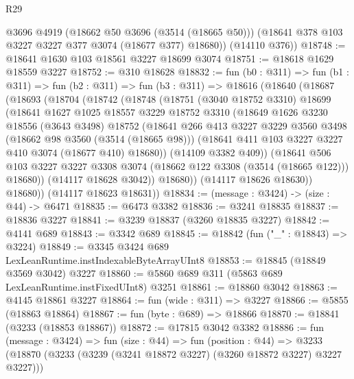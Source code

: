 \begin{lexlean}{R29}
\begin{coremodule}
        @3696
        @4919
        (@18662 @50 @3696 (@3514 (@18665 @50)))
        (@18641 @378 @103 @3227 @3227 @377 @3074 (@18677 @377) @18680))
      (@14110 @376))
@18748 := @18641 @1630 @103 @18561 @3227 @18699 @3074
@18751 := @18618 @1629 @18559 @3227
@18752 := @310 @18628
@18832 := fun (b0 : @311) =>
  fun (b1 : @311) =>
  fun (b2 : @311) =>
  fun (b3 : @311) =>
  @18616
    (@18640
      (@18687
        (@18693
          (@18704
            (@18742
              (@18748
                (@18751
                  (@3040 @18752 @3310)
                  @18699
                  (@18641
                    @1627
                    @1025
                    @18557
                    @3229
                    @18752
                    @3310
                    (@18649
                      @1626
                      @3230
                      @18556
                      (@3643 @3498)
                      @18752
                      (@18641
                        @266
                        @413
                        @3227
                        @3229
                        @3560
                        @3498
                        (@18662 @98 @3560 (@3514 (@18665 @98)))
                        (@18641 @411 @103 @3227 @3227 @410 @3074 (@18677 @410) @18680))
                      (@14109 @3382 @409))
                    (@18641
                      @506
                      @103
                      @3227
                      @3227
                      @3308
                      @3074
                      (@18662 @122 @3308 (@3514 (@18665 @122)))
                      @18680))
                  (@14117 @18628 @3042))
                @18680))
            (@14117 @18626 @18630))
          @18680))
      (@14117 @18623 @18631))
@18834 := (message : @3424) -> (size : @44) -> @6471
@18835 := @6473 @3382
@18836 := @3241 @18835
@18837 := @18836 @3227
@18841 := @3239 @18837 (@3260 @18835 @3227)
@18842 := @4141 @689
@18843 := @3342 @689
@18845 := @18842 (fun ("_" : @18843) => @3224)
@18849 := @3345 @3424 @689 LexLeanRuntime.instIndexableByteArrayUInt8
@18853 := @18845 (@18849 @3569 @3042) @3227
@18860 := @5860 @689 @311 (@5863 @689 LexLeanRuntime.instFixedUInt8) @3251
@18861 := @18860 @3042
@18863 := @4145 @18861 @3227
@18864 := fun (wide : @311) => @3227
@18866 := @5855 (@18863 @18864)
@18867 := fun (byte : @689) => @18866
@18870 := @18841 (@3233 (@18853 @18867))
@18872 := @17815 @3042 @3382
@18886 := fun (message : @3424) =>
  fun (size : @44) =>
  fun (position : @44) =>
  @3233 (@18870 (@3233 (@3239 (@3241 @18872 @3227) (@3260 @18872 @3227) @3227 @3227)))

\end{coremodule}
\end{lexlean}
